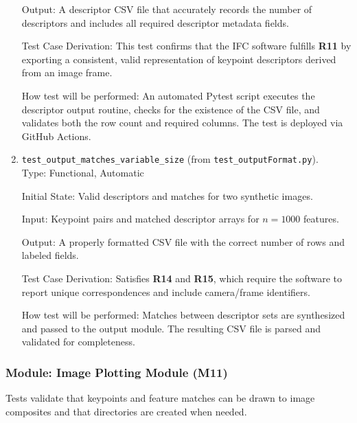 \documentclass[12pt, titlepage]{article}
\begin{document}
\begin{enumerate}
  Output: A descriptor CSV file that accurately records the number of descriptors and includes all required descriptor metadata fields.
  
  Test Case Derivation: This test confirms that the IFC software fulfills \textbf{R11} by exporting a consistent, valid representation of keypoint descriptors derived from an image frame.
  
  How test will be performed: An automated Pytest script executes the descriptor output routine, checks for the existence of the CSV file, and validates both the row count and required columns. The test is deployed via GitHub Actions.
  


  \item \texttt{test\_output\_matches\_variable\_size} \textnormal{(from \texttt{test\_outputFormat.py})}. \\

  Type: Functional, Automatic

  Initial State: Valid descriptors and matches for two synthetic images.

  Input: Keypoint pairs and matched descriptor arrays for \(n = 1000\) features.

  Output: A properly formatted CSV file with the correct number of rows and labeled fields.

  Test Case Derivation: Satisfies \textbf{R14} and \textbf{R15}, which require the software to report unique correspondences and include camera/frame identifiers.

  How test will be performed: Matches between descriptor sets are synthesized and passed to the output module. The resulting CSV file is parsed and validated for completeness.
\end{enumerate}

\subsubsection{Module: Image Plotting Module (M11)}

Tests validate that keypoints and feature matches can be drawn to image composites and that directories are created when needed.
\end{document}
